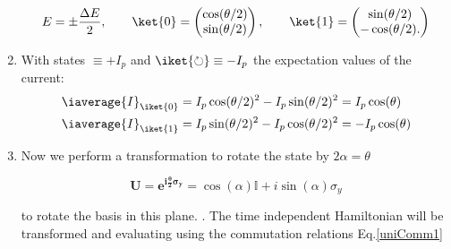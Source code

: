 \begin{enumerate}
 \begin{equation}\label{key}
   E = \pm \frac{\Delta E}{2}, \qquad \ket{0} = \begin{pmatrix}
     \cos(\theta/2) \\ \sin(\theta/2)
   \end{pmatrix},  \qquad \ket{1}  =  \begin{pmatrix} \sin(\theta/2)  \\
     -\cos(\theta/2).
   \end{pmatrix}
 \end{equation}
\item  With   states  \iket{\circlearrowleft}   $  \equiv  +I_p   $  and
  $ \iket{\circlearrowright} \equiv -I_p $ the expectation values of the
  current:
  \begin{equation}\label{key}
    \begin{aligned}
      \iaverage{I}_{\iket{0}} & = I_p\cos(\theta/2)^2 - I_p \sin(\theta/2)^2 = I_p\cos(\theta)\\
      \iaverage{I}_{\iket{1}} & = I_p\sin(\theta/2)^2 - I_p \cos(\theta/2)^2 = - I_p\cos(\theta)\\
    \end{aligned}
  \end{equation}
\item  Now  we   perform  a  transformation  to  rotate   the  state  by
  $ 2\alpha = \theta $

 \begin{equation}
   \mathbf{U=e^{i\frac{\theta}{2}\sigma_y}} =  \cos(\alpha)\mathbb{I}+i\sin(\alpha)\sigma_y
 \end{equation}

 \noindent to rotate the basis in this plane. . The {time
   independent Hamiltonian} will be transformed and evaluating using the
 commutation relations Eq.\eqref{uniComm1}


\end{enumerate}

